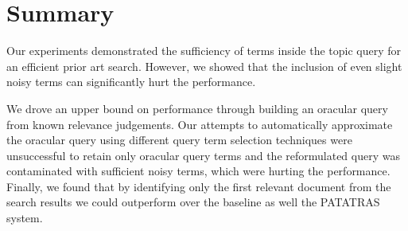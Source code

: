 \section{Summary}
\label{sec:Summary4}
Our experiments demonstrated the sufficiency of terms inside the topic query for an efficient prior art search. 
However, we showed that the inclusion of even slight noisy terms can significantly hurt the performance. 

We drove an upper bound on performance through building an oracular query from known relevance judgements. 
Our attempts to automatically approximate the oracular query using different query term selection techniques 
were unsuccessful to retain only oracular query terms and the reformulated query was contaminated with sufficient 
noisy terms, which were hurting the performance. Finally, we found that by
identifying only the first 
relevant document from the search results we could outperform over the baseline as well the PATATRAS system.

